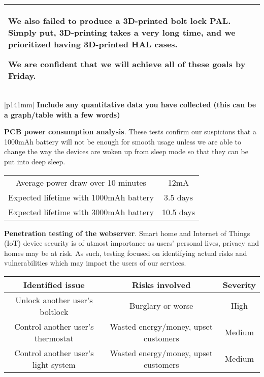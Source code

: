 \documentclass[a4paper]{article}
\newcommand{\colWidth}{141mm}
\begin{document}
\begin{center}
\begin{tabular}{|p{\colWidth}|}
{		\vspace{3mm}

		We also failed to produce a 3D-printed bolt lock PAL. Simply put, 3D-printing takes a very long time, and we
		prioritized having 3D-printed HAL cases.

		\vspace{3mm}

		We are confident that we will achieve all of these goals by Friday.
	}
  \\
  \hline
\end{tabular}
\vskip 5mm


\begin{tabular}{|p{\colWidth}|}
	\hline
	\large
	\textbf{Include any quantitative data you have collected (this can be a graph/table with a few words)}
	\\ \hline

	\textbf{PCB power consumption analysis}. These tests confirm our suspicions that a 1000mAh battery will not be enough for smooth usage unless
	we are able to change the way the devices are woken up from sleep mode so that they can be put into deep sleep.

	\vspace{3mm}

	\begin{tabular}{| c | c |} \hline
		Average power draw over 10 minutes & 12mA \\
		Expected lifetime with 1000mAh battery & 3.5 days \\
		Expected lifetime with 3000mAh battery & 10.5 days \\ \hline
	\end{tabular}

	\vspace{3mm}

	\textbf{Penetration testing of the webserver}.
	Smart home and Internet of Things (IoT) device security is of utmost importance as users' personal lives,
	privacy and homes may be at risk. As such, testing focused on identifying actual risks and vulnerabilities
	which may impact the users of our services.

	\vspace{3mm}

	\begin{tabular}{| c | c | c |} \hline
		\textbf{Identified issue} & \textbf{Risks involved} & \textbf{Severity} \\ \hline
		Unlock another user's boltlock & Burglary or worse & High \\
		Control another user's thermostat & Wasted energy/money, upset customers & Medium \\
		Control another user's light system & Wasted energy/money, upset customers & Medium \\ \hline
	\end{tabular}


\end{tabular}
\end{center}
\end{document}
